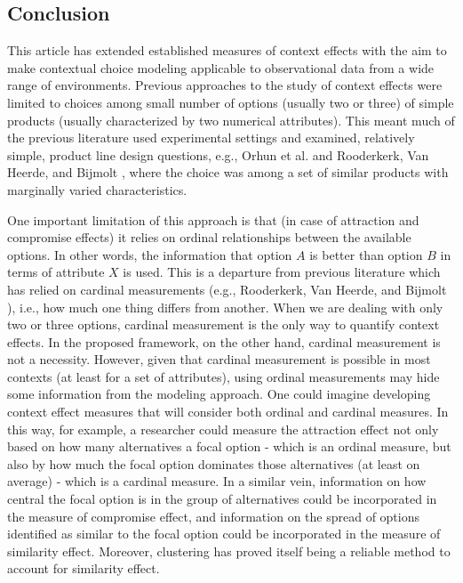 \documentclass[a4paper,12pt]{article}
\newcommand{\citeyearonly}[1]{\citeyearpar{#1}}
\begin{document}
\clearpage

\subsection{Conclusion}

This article has extended established measures of context effects with the aim to make contextual choice modeling applicable to observational data from a wide range of environments. Previous approaches to the study of context effects were limited to choices among small number of options (usually two or three) of simple products (usually characterized by two numerical attributes). This meant much of the previous literature used experimental settings and examined, relatively simple, product line design questions, e.g., Orhun et al. \citeyearonly{orhun09} and Rooderkerk, Van Heerde, and Bijmolt \citeyearonly{roodrkerkEtAl11}, where the choice was among a set of similar products with marginally varied characteristics. 

One important limitation of this approach is that (in case of attraction and compromise effects) it relies on ordinal relationships between the available options. In other words, the information that option $A$ is better than option $B$ in terms of attribute $X$ is used. This is a departure from previous literature which has relied on cardinal measurements (e.g., Rooderkerk, Van Heerde, and Bijmolt \citeyearonly{roodrkerkEtAl11}), i.e., how much one thing differs from another. When we are dealing with only two or three options, cardinal measurement is the only way to quantify context effects. In the proposed framework, on the other hand, cardinal measurement is not a necessity. However, given that cardinal measurement is possible in most contexts (at least for a set of attributes), using ordinal measurements may hide some information from the modeling approach. One could imagine developing context effect measures that will consider both ordinal and cardinal measures. In this way, for example, a researcher could measure the attraction effect not only based on how many alternatives a focal option - which is an ordinal measure, but also by how much the focal option dominates those alternatives (at least on average) - which is a cardinal measure. In a similar vein, information on how central the focal option is in the group of alternatives could be incorporated in the measure of compromise effect, and information on the spread of options identified as similar to the focal option could be incorporated in the measure of similarity effect.  Moreover, clustering has proved itself being a reliable method to account for similarity effect.
\end{document}
